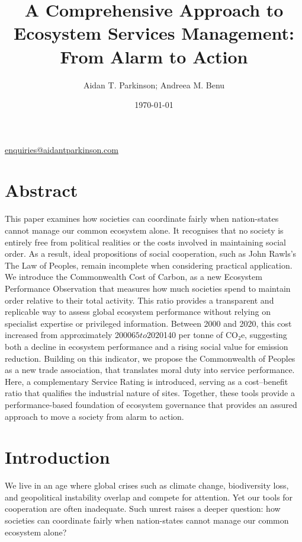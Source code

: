 \documentclass[12pt, oneside]{article}   	%
\title{A Comprehensive Approach to Ecosystem Services Management: From Alarm to Action}
\author{Aidan T. Parkinson; Andreea M. Benu}
\date{\today}							%
\begin{document}
\maketitle
\begin{center}
\href{mailto:enquiries@aidantparkinson.com}{enquiries@aidantparkinson.com}
\end{center}

\section{Abstract}
This paper examines how societies can coordinate fairly when nation-states cannot manage our common ecosystem alone.
It recognises that no society is entirely free from political realities or the costs involved in maintaining social order.
As a result, ideal propositions of social cooperation, such as John Rawls’s The Law of Peoples, remain incomplete when considering practical application.
We introduce the Commonwealth Cost of Carbon, as a new Ecosystem Performance Observation that measures how much societies spend to maintain order relative to their total activity.
This ratio provides a transparent and replicable way to assess global ecosystem performance without relying on specialist expertise or privileged information.
Between 2000 and 2020, this cost increased from approximately 2000$65 to 2020$140 per tonne of CO₂e, suggesting both a decline in ecosystem performance and a rising social value for emission reduction.
Building on this indicator, we propose the Commonwealth of Peoples as a new trade association, that translates moral duty into service performance.
Here, a complementary Service Rating is introduced, serving as a cost–benefit ratio that qualifies the industrial nature of sites.
Together, these tools provide a performance-based foundation of ecosystem governance that provides an assured approach to move a society from alarm to action.

\section{Introduction}

We live in an age where global crises such as climate change, biodiversity loss, and geopolitical instability overlap and compete for attention. Yet our tools for cooperation are often inadequate.
Such unrest raises a deeper question: how societies can coordinate fairly when nation-states cannot manage our common ecosystem alone?\\
\end{document}
